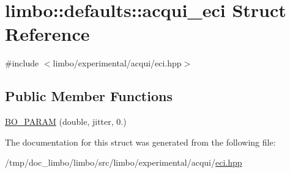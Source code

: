 \hypertarget{structlimbo_1_1defaults_1_1acqui__eci}{}\section{limbo\+:\+:defaults\+:\+:acqui\+\_\+eci Struct Reference}
\label{structlimbo_1_1defaults_1_1acqui__eci}


{\ttfamily \#include $<$limbo/experimental/acqui/eci.\+hpp$>$}

\subsection*{Public Member Functions}
\begin{DoxyCompactItemize}
\item 
\hyperlink{group__acqui__defaults_ga810b64e9658f27a5cf32463957599b69}{B\+O\+\_\+\+P\+A\+R\+A\+M} (double, jitter, 0.)
\end{DoxyCompactItemize}


The documentation for this struct was generated from the following file\+:\begin{DoxyCompactItemize}
\item 
/tmp/doc\+\_\+limbo/limbo/src/limbo/experimental/acqui/\hyperlink{eci_8hpp}{eci.\+hpp}\end{DoxyCompactItemize}
